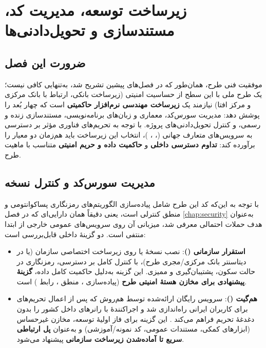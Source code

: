 \chapter{زیرساخت توسعه، مدیریت کد، مستندسازی و تحویل‌دادنی‌ها}
\label{chap:devops}

\section{ضرورت این فصل}

موفقیت فنی طرح، همان‌طور که در فصل‌های پیشین تشریح شد، به‌تنهایی کافی نیست؛ یک طرح ملی با این سطح از حساسیت امنیتی (زیرساخت بانکی، ارتباط با بانک مرکزی و مرکز افتا) نیازمند یک \textbf{زیرساخت مهندسی نرم‌افزار حاکمیتی} است که چهار بُعد را پوشش دهد: مدیریت سورس‌کد، معماری و زبان‌های برنامه‌نویسی، مستندسازی زنده و رسمی، و کنترل تحویل‌دادنی‌های پروژه. با توجه به تحریم‌های فناوری مؤثر بر دسترسی به سرویس‌های متعارف جهانی (، ، )، انتخاب این زیرساخت باید هم‌زمان دو معیار را برآورده کند: \textbf{تداوم دسترسی داخلی} و \textbf{حاکمیت داده و حریم امنیتی} متناسب با ماهیت طرح.

\section{مدیریت سورس‌کد و کنترل نسخه}
\label{sec:vcsgovernance}

با توجه به این‌که کد این طرح شامل پیاده‌سازی الگوریتم‌های رمزنگاری پساکوانتومی و منطق کنترلی  است، یعنی دقیقاً همان دارایی‌ای که در فصل \ref{chap:security} به‌عنوان هدف حملات احتمالی معرفی شد، میزبانی آن روی سرویس‌های عمومی خارجی از ابتدا منتفی است. دو گزینهٔ داخلی قابل‌بررسی است:

\begin{itemize}
\item \textbf{استقرار  سازمانی ()}: نصب نسخهٔ  یا  روی زیرساخت اختصاصی سازمان (یا در دیتاسنتر بانک مرکزی/مجری طرح)، با کنترل کامل بر دسترسی، رمزنگاری در حالت سکون، پشتیبان‌گیری و ممیزی. این گزینه به‌دلیل حاکمیت کامل داده، \textbf{گزینهٔ پیشنهادی برای مخازن هستهٔ امنیتی طرح} (پیاده‌سازی ، منطق ، رابط ) است.
\item \textbf{هم‌گیت ()}: سرویس رایگان  ارائه‌شده توسط هم‌روش که پس از اعمال تحریم‌های  برای کاربران ایرانی راه‌اندازی شد و اجراکنندهٔ  با رانرهای داخل کشور را بدون دغدغهٔ تحریم فراهم می‌کند \Cite{hamgit2026}. این گزینه برای فاز اولیهٔ توسعه، مخازن غیرحساس (ابزارهای کمکی، مستندات عمومی، کد نمونه/آموزشی) و به‌عنوان \textbf{پل ارتباطی سریع تا آماده‌شدن زیرساخت سازمانی} پیشنهاد می‌شود.
\end{itemize}

